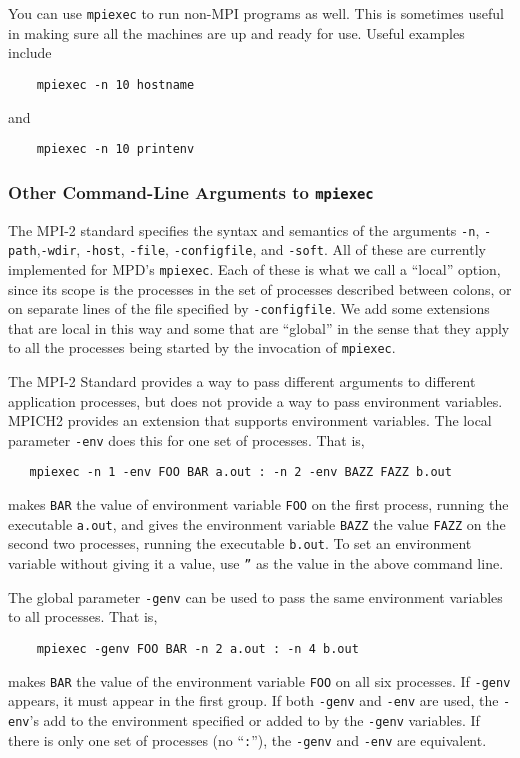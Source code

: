 \documentclass[dvipdfm,11pt]{article}
\begin{document}
You can use \texttt{mpiexec} to run non-MPI programs as well.  This is
sometimes useful in making sure all the machines are up and ready for
use.  Useful examples include
\begin{verbatim}
    mpiexec -n 10 hostname
\end{verbatim}
and
\begin{verbatim}
    mpiexec -n 10 printenv
\end{verbatim}


\subsubsection{Other Command-Line Arguments to \texttt{mpiexec}}
\label{sec:environment}

The MPI-2 standard specifies the syntax and semantics of the arguments
\texttt{-n}, \texttt{-path},\texttt{-wdir}, \texttt{-host},
\texttt{-file}, \texttt{-configfile}, and \texttt{-soft}.  All of these
are currently implemented for MPD's \texttt{mpiexec}.
Each of these is what we call a ``local'' option, since
its scope is the processes in the set of processes described between
colons, or on separate lines of the file specified by
\texttt{-configfile}.  We add some extensions that are local in this way
and some that are ``global'' in the sense that they apply to all the
processes being started by the invocation of \texttt{mpiexec}.

The MPI-2 Standard provides a way to pass different arguments to different
application processes, but does not provide a way to pass environment
variables.  MPICH2 provides an extension that supports environment
variables.
The local parameter \texttt{-env} does this for one set of
processes.  That is,
\begin{verbatim}
   mpiexec -n 1 -env FOO BAR a.out : -n 2 -env BAZZ FAZZ b.out
\end{verbatim}
makes \texttt{BAR} the value of environment variable \texttt{FOO} on the
first process, running the executable \texttt{a.out}, and gives the
environment variable \texttt{BAZZ} the value \texttt{FAZZ} on the second
two processes, running the executable \texttt{b.out}.  To set an
environment variable without giving it a value, use \texttt{''} as the
value in the above command line.

The global parameter \texttt{-genv} can be used to pass the same
environment variables to all processes.  That is,
\begin{verbatim}
    mpiexec -genv FOO BAR -n 2 a.out : -n 4 b.out
\end{verbatim}
makes \texttt{BAR} the value of the environment variable \texttt{FOO} on
all six processes.  If \texttt{-genv} appears, it must appear in the
first group.  If both \texttt{-genv} and \texttt{-env} are used, the
\texttt{-env}'s add to the environment specified or added to by the
\texttt{-genv} variables.  If there is only one set of processes (no
``\texttt{:}''), the \texttt{-genv} and \texttt{-env} are equivalent.
\end{document}
